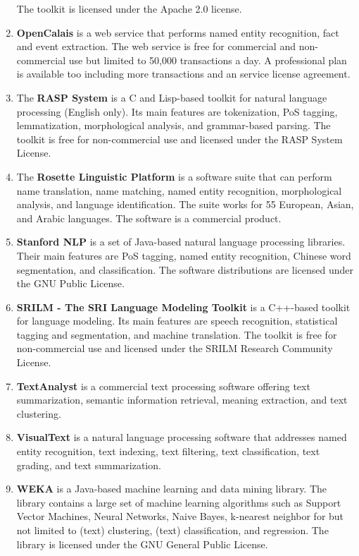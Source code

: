 \documentclass[a4paper,twoside]{book}      %
\begin{document}
\begin{enumerate}
The toolkit is licensed under the Apache 2.0 license.
\item \textbf{OpenCalais} \cite{opencalais} is a web service that performs named entity recognition, fact and event extraction.
The web service is free for commercial and non-commercial use but limited to 50,000 transactions a day. A professional plan is available too including more transactions and an service license agreement.
\item The \textbf{RASP System} \cite{briscoe2006second} is a C and Lisp-based toolkit for natural language processing (English only). Its main features are tokenization, PoS tagging, lemmatization, morphological analysis, and grammar-based parsing.
The toolkit is free for non-commercial use and licensed under the RASP System License.
\item The \textbf{Rosette Linguistic Platform} \cite{rosette} is a software suite that can perform name translation, name matching, named entity recognition, morphological analysis, and language identification. The suite works for 55 European, Asian, and Arabic languages.
The software is a commercial product.
\item \textbf{Stanford NLP} \cite{stanfordnlp} is a set of Java-based natural language processing libraries. Their main features are PoS tagging, named entity recognition, Chinese word segmentation, and classification.
The software distributions are licensed under the GNU Public License.
\item \textbf{SRILM - The SRI Language Modeling Toolkit} \cite{stolcke2002srilm} is a C++-based toolkit for language modeling. Its main features are speech recognition, statistical tagging and segmentation, and machine translation.
The toolkit is free for non-commercial use and licensed under the SRILM Research Community License.
\item \textbf{TextAnalyst} \cite{textanalyst} is a commercial text processing software offering text summarization, semantic information retrieval, meaning extraction, and text clustering.
\item \textbf{VisualText} \cite{visualtext} is a natural language processing software that addresses named entity recognition, text indexing, text filtering, text classification, text grading, and text summarization.
\item \textbf{WEKA} \cite{hall2009weka} is a Java-based machine learning and data mining library. The library contains a large set of machine learning algorithms such as Support Vector Machines, Neural Networks, Naive Bayes, k-nearest neighbor for but not limited to (text) clustering, (text) classification, and regression.
The library is licensed under the GNU General Public License.
\end{enumerate}
\end{document}
